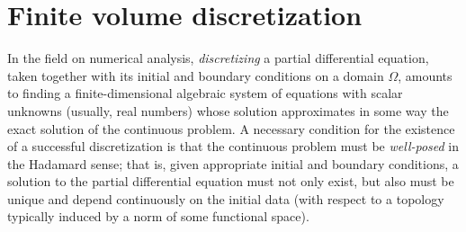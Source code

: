 %  
%  
%  

\chapter{Finite volume discretization}

In the field on numerical analysis, \emph{discretizing} a partial differential
equation, taken together with its initial and boundary conditions
on a domain $\Omega$, amounts to finding a finite-dimensional algebraic
system of equations with scalar unknowns (usually, real numbers) whose
solution approximates in some way the exact solution of the continuous
problem. A necessary condition for the existence of a successful discretization
is that the continuous problem must be \emph{well-posed} in the Hadamard
sense; that is, given appropriate initial and boundary conditions, a solution
to the partial differential equation must not only exist, but also
must be unique and depend continuously on the initial data (with respect
to a topology typically induced by a norm of some functional space).

